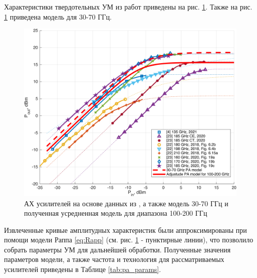 Характеристики твердотельных УМ из работ
\cite{zhang2021}\cite{amadorey2018}\cite{aliyun2020} приведены на рис.
\ref{fig:pa_research_mean}. Также на рис. \ref{fig:pa_research_mean}
приведена модель для 30-70 ГГц.
\begin{figure}[h]
    \centering
    \includegraphics[width=0.95\linewidth]{figs/pacomparison.png}
    \caption{АХ усилителей на основе данных из
    \cite{zhang2021}\cite{amadorey2018}\cite{aliyun2020}, а также
    модель 30-70 ГГц \cite{nokia163314} и полученная усредненная модель
    для диапазона 100-200 ГГц}
    \label{fig:pa_research_mean}
\end{figure}

Извлеченные кривые амплитудных характеристик были аппроксимированы при
помощи модели Раппа \ref{eq:Rapp} (см. рис. \ref{fig:pa_research_mean} -
пунктирные линии), что позволило собрать параметры УМ для дальнейшей
обработки. Полученные значения параметров модели, а также частота и
технология для рассматриваемых усилителей приведены в Таблице
\ref{tab:pa_params}. 

